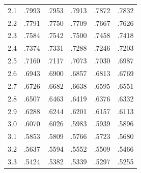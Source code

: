 \begin{minipage}[t]{95mm}
{\begin{tabular}{cccccc}
        2.1            & .7993                    & .7953                    & .7913                    & .7872                    & .7832                    \\
        2.2            & .7791                    & .7750                    & .7709                    & .7667                    & .7626                    \\
        2.3            & .7584                    & .7542                    & .7500                    & .7458                    & .7418                    \\
        2.4            & .7374                    & .7331                    & .7288                    & .7246                    & .7203                    \\
        2.5            & .7160                    & .7117                    & .7073                    & .7030                    & .6987                    \\
        2.6            & .6943                    & .6900                    & .6857                    & .6813                    & .6769                    \\
        2.7            & .6726                    & .6682                    & .6638                    & .6595                    & .6551                    \\
        2.8            & .6507                    & .6463                    & .6419                    & .6376                    & .6332                    \\
        2.9            & .6288                    & .6244                    & .6201                    & .6157                    & .6113                    \\[1.5ex]
        3.0            & .6070                    & .6026                    & .5983                    & .5939                    & .5896                    \\
        3.1            & .5853                    & .5809                    & .5766                    & .5723                    & .5680                    \\
        3.2            & .5637                    & .5594                    & .5552                    & .5509                    & .5466                    \\
        3.3            & .5424                    & .5382                    & .5339                    & .5297                    & .5255                    \\

\end{tabular}}
\end{minipage}

